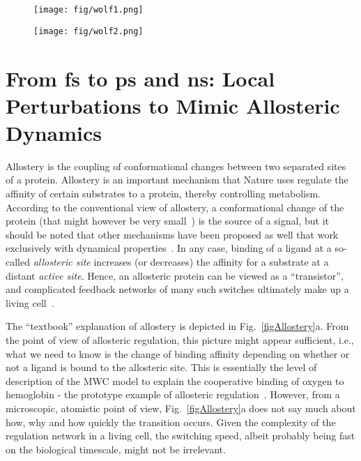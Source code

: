 \documentclass[journal=jacsat,manuscript=article]{achemso}
\begin{document}
\begin{figure}
\texttt{[image: fig/wolf1.png]}
\caption{        }
\label{fig:wolf1}
\end{figure}


\begin{figure}
\texttt{[image: fig/wolf2.png]}
\caption{        }
\label{fig:wolf2}
\end{figure} 


\section{From fs to ps and ns: Local Perturbations to Mimic Allosteric Dynamics}
Allostery is the coupling of conformational changes between two
separated sites of a protein. Allostery is an important mechanism that
Nature uses regulate the affinity of certain substrates to a protein,
thereby controlling metabolism. According to the conventional view of
allostery, a conformational change of the protein (that might however
be very small~\cite{Nussinov15}) is the source of a signal, but it
should be noted that other mechanisms have been proposed as well that
work exclusively with dynamical properties~\cite{cooper84}. In any
case, binding of a ligand at a so-called \textit{allosteric site}
increases (or decreases) the affinity for a substrate at a distant
\textit{active site}. Hence, an allosteric protein can be viewed as a
``transistor'', and complicated feedback networks of many such
switches ultimately make up a living cell~\cite{alon07}.

The ``textbook'' explanation of allostery is depicted in
Fig.~\ref{figAllostery}a. From the point of view of allosteric
regulation, this picture might appear sufficient, i.e., what we need
to know is the change of binding affinity depending on whether or not
a ligand is bound to the allosteric site. This is essentially the
level of description of the MWC model to explain the cooperative
binding of oxygen to hemoglobin - the prototype example of allosteric
regulation~\cite{Eaton99}. However, from a microscopic, atomistic
point of view, Fig.~\ref{figAllostery}a does not say much about how,
why and how quickly the transition occurs. Given the complexity of the
regulation network in a living cell, the switching speed, albeit
probably being fast on the biological timescale, might not be
irrelevant.
\end{document}
